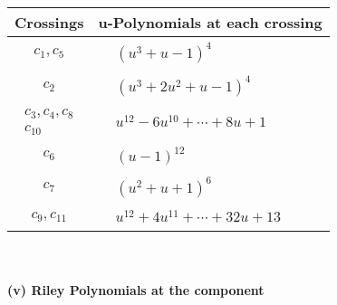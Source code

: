 \documentclass[1p]{elsarticle_modified}
\theoremstyle{definition}
\begin{document}
\begin{tabular}{m{50pt}|m{274pt}}
Crossings & \hspace{64pt}u-Polynomials at each crossing \\
\hline $$\begin{aligned}c_{1},c_{5}\end{aligned}$$&$\begin{aligned}
&(u^3+u-1)^4
\end{aligned}$\\
\hline $$\begin{aligned}c_{2}\end{aligned}$$&$\begin{aligned}
&(u^3+2 u^2+u-1)^4
\end{aligned}$\\
\hline $$\begin{aligned}c_{3},c_{4},c_{8}\\c_{10}\end{aligned}$$&$\begin{aligned}
&u^{12}-6 u^{10}+\cdots+8 u+1
\end{aligned}$\\
\hline $$\begin{aligned}c_{6}\end{aligned}$$&$\begin{aligned}
&(u-1)^{12}
\end{aligned}$\\
\hline $$\begin{aligned}c_{7}\end{aligned}$$&$\begin{aligned}
&(u^2+u+1)^6
\end{aligned}$\\
\hline $$\begin{aligned}c_{9},c_{11}\end{aligned}$$&$\begin{aligned}
&u^{12}+4 u^{11}+\cdots+32 u+13
\end{aligned}$\\
\hline
\end{tabular}\\~\\
\newpage\renewcommand{\arraystretch}{1}
\flushleft \textbf{(v) Riley Polynomials at the component}\newline \\
\end{document}
